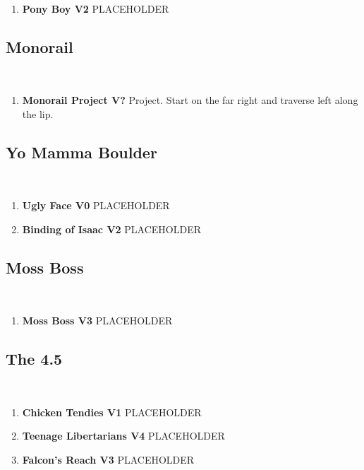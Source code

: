 \begin{enumerate}[]
	\item\label{rt:Pony Boy} \colorbox{green!20}{\textbf{Pony Boy V2  } }
	\newline PLACEHOLDER\
\end{enumerate}
\subsection*{Monorail}\label{bf:Monorail}
\

\begin{enumerate}[resume]
	\item\label{rt:Monorail Project} \colorbox{black!20}{\textbf{Monorail Project V?  } }
	\newline Project. Start on the far right and traverse left along the lip.\
\end{enumerate}
\subsection*{Yo Mamma Boulder}\label{bf:Yo Mamma Boulder}
\

\begin{enumerate}[resume]
	\item\label{rt:Ugly Face} \colorbox{green!20}{\textbf{Ugly Face V0   \warn } }
	\newline PLACEHOLDER\
	\item\label{rt:Binding of Isaac} \colorbox{green!20}{\textbf{Binding of Isaac V2    \warn } }
	\newline PLACEHOLDER\
\end{enumerate}
\subsection*{Moss Boss}\label{bf:Moss Boss}
\

\begin{enumerate}[resume]
	\item\label{rt:Moss Boss} \colorbox{green!20}{\textbf{Moss Boss V3   } }
	\newline PLACEHOLDER\
\end{enumerate}
\subsection*{The 4.5}\label{bf:The 4.5}
\

\begin{enumerate}[resume]
	\item\label{rt:Chicken Tendies} \colorbox{green!20}{\textbf{Chicken Tendies V1   } }
	\newline PLACEHOLDER\
	\item\label{rt:Teenage Libertarians} \colorbox{RoyalBlue!20}{\textbf{Teenage Libertarians V4     } }
	\newline PLACEHOLDER\
	\item\label{rt:Falcon's Reach} \colorbox{green!20}{\textbf{Falcon's Reach V3   } }
	\newline PLACEHOLDER\
\end{enumerate}
